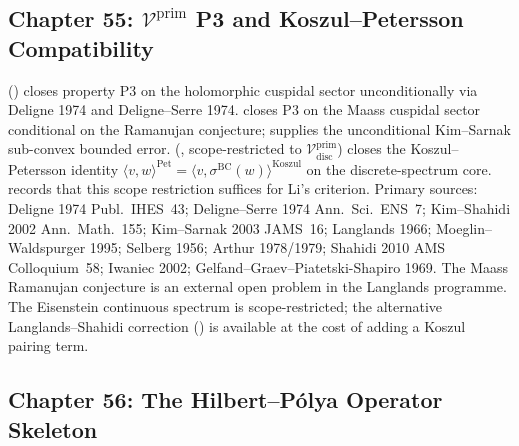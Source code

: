 \subsection{Chapter 55: \(\mathcal{V}^{\mathrm{prim}}\) P3 and Koszul--Petersson Compatibility}
\label{v4-arith:w5-synth:ch55}

 (\ClaimStatusProvedHere)
closes property P3 on the holomorphic cuspidal sector unconditionally
via Deligne 1974 and Deligne--Serre 1974.
 closes P3 on the Maass
cuspidal sector conditional on the Ramanujan conjecture;
 supplies the unconditional
Kim--Sarnak sub-convex bounded error.
 (\ClaimStatusProvedHere,
scope-restricted to \(\mathcal{V}^{\mathrm{prim}}_{\mathrm{disc}}\))
closes the Koszul--Petersson identity
\(\langle v,w\rangle^{\mathrm{Pet}}=\langle v,\sigma^{\mathrm{BC}}(w)\rangle^{\mathrm{Koszul}}\)
on the discrete-spectrum core.
 records that this
scope restriction suffices for Li's criterion.
Primary sources: Deligne 1974 Publ.~IHES~43;
Deligne--Serre 1974 Ann.~Sci.~ENS~7; Kim--Shahidi 2002
Ann.~Math.~155; Kim--Sarnak 2003 JAMS~16; Langlands 1966;
Moeglin--Waldspurger 1995; Selberg 1956; Arthur 1978/1979;
Shahidi 2010 AMS Colloquium~58; Iwaniec 2002;
Gelfand--Graev--Piatetski-Shapiro 1969.
The Maass Ramanujan conjecture is an external open problem in the
Langlands programme. The Eisenstein continuous spectrum is
scope-restricted; the alternative Langlands--Shahidi correction
() is available at the cost of
adding a Koszul pairing term.

\subsection{Chapter 56: The Hilbert--P\'{o}lya Operator Skeleton}
\label{v4-arith:w5-synth:ch56}

